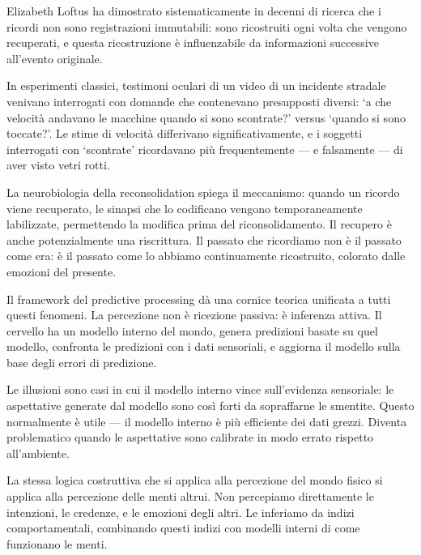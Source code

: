\documentclass[12pt,a4paper,openany]{book}
\newcommand{\sezione}[1]{\vspace{1.2em}{\large\bfseries #1}\vspace{0.5em}\par}
\begin{document}
\sezione{La memoria come ricostruzione: Loftus e i falsi ricordi}

Elizabeth Loftus ha dimostrato sistematicamente in decenni di ricerca che i ricordi non sono registrazioni immutabili: sono ricostruiti ogni volta che vengono recuperati, e questa ricostruzione è influenzabile da informazioni successive all'evento originale.

In esperimenti classici, testimoni oculari di un video di un incidente stradale venivano interrogati con domande che contenevano presupposti diversi: `a che velocità andavano le macchine quando si sono scontrate?' versus `quando si sono toccate?'. Le stime di velocità differivano significativamente, e i soggetti interrogati con `scontrate' ricordavano più frequentemente — e falsamente — di aver visto vetri rotti.

La neurobiologia della reconsolidation spiega il meccanismo: quando un ricordo viene recuperato, le sinapsi che lo codificano vengono temporaneamente labilizzate, permettendo la modifica prima del riconsolidamento. Il recupero è anche potenzialmente una riscrittura. Il passato che ricordiamo non è il passato come era: è il passato come lo abbiamo continuamente ricostruito, colorato dalle emozioni del presente.

\sezione{La percezione come inferenza bayesiana}

Il framework del predictive processing dà una cornice teorica unificata a tutti questi fenomeni. La percezione non è ricezione passiva: è inferenza attiva. Il cervello ha un modello interno del mondo, genera predizioni basate su quel modello, confronta le predizioni con i dati sensoriali, e aggiorna il modello sulla base degli errori di predizione.

Le illusioni sono casi in cui il modello interno vince sull'evidenza sensoriale: le aspettative generate dal modello sono così forti da sopraffarne le smentite. Questo normalmente è utile --- il modello interno è più efficiente dei dati grezzi. Diventa problematico quando le aspettative sono calibrate in modo errato rispetto all'ambiente.

\sezione{La costruzione dell'altro: empatia e mentalizzazione}

La stessa logica costruttiva che si applica alla percezione del mondo fisico si applica alla percezione delle menti altrui. Non percepiamo direttamente le intenzioni, le credenze, e le emozioni degli altri. Le inferiamo da indizi comportamentali, combinando questi indizi con modelli interni di come funzionano le menti.
\end{document}
